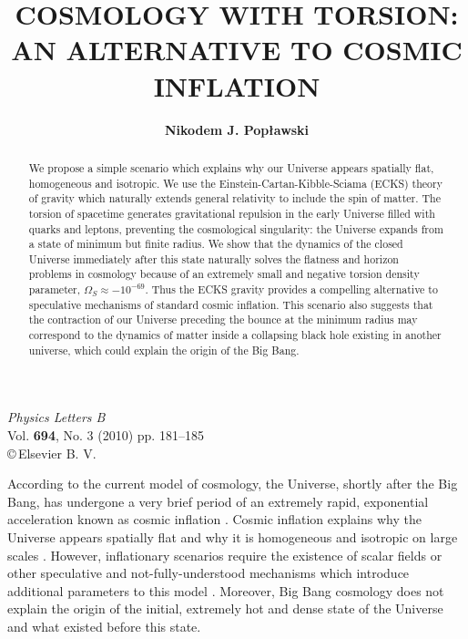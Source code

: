 \documentclass[prd,onecolumn,nofootinbib,showkeys]{revtex4}
\begin{document}
\title{COSMOLOGY WITH TORSION: AN ALTERNATIVE TO COSMIC INFLATION}

\author{{\bf Nikodem J. Pop{\l}awski}}


\noindent
{\em Physics Letters B}\\
Vol. {\bf 694}, No. 3 (2010) pp. 181--185\\
\copyright\,Elsevier B. V.
\vspace{0.4in}

\begin{abstract}
We propose a simple scenario which explains why our Universe appears spatially flat, homogeneous and isotropic.
We use the Einstein-Cartan-Kibble-Sciama (ECKS) theory of gravity which naturally extends general relativity to include the spin of matter.
The torsion of spacetime generates gravitational repulsion in the early Universe filled with quarks and leptons, preventing the cosmological singularity: the Universe expands from a state of minimum but finite radius.
We show that the dynamics of the closed Universe immediately after this state naturally solves the flatness and horizon problems in cosmology because of an extremely small and negative torsion density parameter, $\Omega_S\approx-10^{-69}$.
Thus the ECKS gravity provides a compelling alternative to speculative mechanisms of standard cosmic inflation.
This scenario also suggests that the contraction of our Universe preceding the bounce at the minimum radius may correspond to the dynamics of matter inside a collapsing black hole existing in another universe, which could explain the origin of the Big Bang.
\end{abstract}


\maketitle

According to the current model of cosmology, the Universe, shortly after the Big Bang, has undergone a very brief period of an extremely rapid, exponential acceleration known as cosmic inflation \cite{inf1,inf2}.
Cosmic inflation explains why the Universe appears spatially flat and why it is homogeneous and isotropic on large scales \cite{inf1}.
However, inflationary scenarios require the existence of scalar fields or other speculative and not-fully-understood mechanisms which introduce additional parameters to this model \cite{inf2}.
Moreover, Big Bang cosmology does not explain the origin of the initial, extremely hot and dense state of the Universe and what existed before this state.
\end{document}
